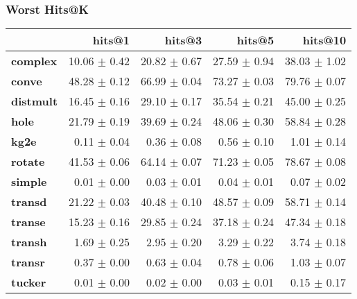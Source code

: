 \documentclass{article}
\begin{document}
    \subsubsection{Worst Hits@K}
    \begin{center}
    \begin{tabular}{lrrrr}
\toprule
{} &        hits@1 &        hits@3 &        hits@5 &       hits@10 \\
\midrule
\textbf{complex } &  10.06 $\pm$ 0.42 &  20.82 $\pm$ 0.67 &  27.59 $\pm$ 0.94 &  38.03 $\pm$ 1.02 \\
\textbf{conve   } &  48.28 $\pm$ 0.12 &  66.99 $\pm$ 0.04 &  73.27 $\pm$ 0.03 &  79.76 $\pm$ 0.07 \\
\textbf{distmult} &  16.45 $\pm$ 0.16 &  29.10 $\pm$ 0.17 &  35.54 $\pm$ 0.21 &  45.00 $\pm$ 0.25 \\
\textbf{hole    } &  21.79 $\pm$ 0.19 &  39.69 $\pm$ 0.24 &  48.06 $\pm$ 0.30 &  58.84 $\pm$ 0.28 \\
\textbf{kg2e    } &   0.11 $\pm$ 0.04 &   0.36 $\pm$ 0.08 &   0.56 $\pm$ 0.10 &   1.01 $\pm$ 0.14 \\
\textbf{rotate  } &  41.53 $\pm$ 0.06 &  64.14 $\pm$ 0.07 &  71.23 $\pm$ 0.05 &  78.67 $\pm$ 0.08 \\
\textbf{simple  } &   0.01 $\pm$ 0.00 &   0.03 $\pm$ 0.01 &   0.04 $\pm$ 0.01 &   0.07 $\pm$ 0.02 \\
\textbf{transd  } &  21.22 $\pm$ 0.03 &  40.48 $\pm$ 0.10 &  48.57 $\pm$ 0.09 &  58.71 $\pm$ 0.14 \\
\textbf{transe  } &  15.23 $\pm$ 0.16 &  29.85 $\pm$ 0.24 &  37.18 $\pm$ 0.24 &  47.34 $\pm$ 0.18 \\
\textbf{transh  } &   1.69 $\pm$ 0.25 &   2.95 $\pm$ 0.20 &   3.29 $\pm$ 0.22 &   3.74 $\pm$ 0.18 \\
\textbf{transr  } &   0.37 $\pm$ 0.00 &   0.63 $\pm$ 0.04 &   0.78 $\pm$ 0.06 &   1.03 $\pm$ 0.07 \\
\textbf{tucker  } &   0.01 $\pm$ 0.00 &   0.02 $\pm$ 0.00 &   0.03 $\pm$ 0.01 &   0.15 $\pm$ 0.17 \\
\bottomrule
\end{tabular}

    \end{center}
\end{document}
